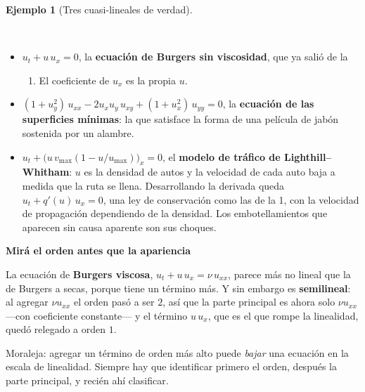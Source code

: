 \documentclass[
  spanish,
  a4paper,
]{scrbook}
\providecommand{\tightlist}{%
  \setlength{\itemsep}{0pt}\setlength{\parskip}{0pt}}
\theoremstyle{definition}
\theoremstyle{plain}
\theoremstyle{definition}
\newtheorem{example}{Ejemplo}[chapter]
\theoremstyle{plain}
\theoremstyle{definition}
\theoremstyle{remark}
\begin{document}
\begin{example}[Tres cuasi-lineales de
verdad]\protect\hypertarget{exm-cuasilineales}{}\label{exm-cuasilineales}

~

\begin{itemize}
\tightlist
\item
  \(u_t + u\,u_x = 0\), la \textbf{ecuación de Burgers sin viscosidad},
  que ya salió de la

  \begin{enumerate}
  \def\labelenumi{\arabic{enumi}.}
  \tightlist
  \item
    El coeficiente de \(u_x\) es la propia \(u\).
  \end{enumerate}
\item
  \((1+u_y^2)\,u_{xx} - 2u_xu_y\,u_{xy} + (1+u_x^2)\,u_{yy} = 0\), la
  \textbf{ecuación de las superficies mínimas}: la que satisface la
  forma de una película de jabón sostenida por un alambre.
\item
  \(u_t + \big(u\,v_{\max}(1-u/u_{\max})\big)_x = 0\), el \textbf{modelo
  de tráfico de Lighthill--Whitham}: \(u\) es la densidad de autos y la
  velocidad de cada auto baja a medida que la ruta se llena.
  Desarrollando la derivada queda \(u_t + q'(u)\,u_x = 0\), una ley de
  conservación como las de la 1, con la velocidad de propagación
  dependiendo de la densidad. Los embotellamientos que aparecen sin
  causa aparente son sus choques.
\end{itemize}

\end{example}

\begin{tcolorbox}[enhanced jigsaw, arc=.35mm, bottomrule=.15mm, breakable, colback=white, colframe=quarto-callout-warning-color-frame, left=2mm, leftrule=.75mm, opacityback=0, rightrule=.15mm, toprule=.15mm]
\begin{minipage}[t]{5.5mm}
\textcolor{quarto-callout-warning-color}{\faExclamationTriangle}
\end{minipage}%
\begin{minipage}[t]{\textwidth - 5.5mm}

\vspace{-3mm}\textbf{Mirá el orden antes que la apariencia}\vspace{3mm}

La ecuación de \textbf{Burgers viscosa}, \(u_t + u\,u_x = \nu\,u_{xx}\),
parece más no lineal que la de Burgers a secas, porque tiene un término
más. Y sin embargo es \textbf{semilineal}: al agregar \(\nu u_{xx}\) el
orden pasó a ser \(2\), así que la parte principal es ahora solo
\(\nu u_{xx}\) ---con coeficiente constante--- y el término \(u\,u_x\),
que es el que rompe la linealidad, quedó relegado a orden \(1\).

Moraleja: agregar un término de orden más alto puede \emph{bajar} una
ecuación en la escala de linealidad. Siempre hay que identificar primero
el orden, después la parte principal, y recién ahí clasificar.

\end{minipage}%
\end{tcolorbox}
\end{document}
